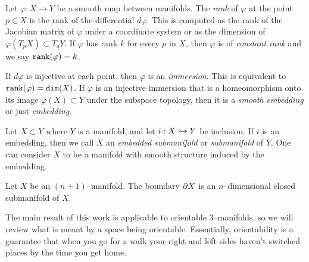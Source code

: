 \begin{defn}[Embedding]
	Let $\varphi:X\to Y$ be a smooth map between manifolds.
	The \emph{rank} of $\varphi$ at the point $p\in X$ is the rank of the differential $d\varphi$.
	This is computed as the rank of the Jacobian matrix of $\varphi$ under a coordinate system or as the dimension of $\varphi(T_p X)\subset T_q Y$.
	If $\varphi$ has rank $k$ for every $p$ in $X$, then $\varphi$ is of \emph{constant rank} and we say $\texttt{rank}(\varphi)=k$.
	
	If $d\varphi$ is injective at each point, then $\varphi$ is an \emph{immersion}.
	This is equivalent to $\texttt{rank}(\varphi)=\texttt{dim}(X)$.
	If $\varphi$ is an injective immersion that is a homeomorphism onto its image $\varphi(X)\subset Y$ under the subspace topology, then it is a \emph{smooth embedding} or just \emph{embedding}.
	
	Let $X\subset Y$ where $Y$ is a manifold, and let $i:X\hookrightarrow Y$ be inclusion.
	If $i$ is an embedding, then we call $X$ an \emph{embedded submanifold} or \emph{submanifold} of $Y$.
	One can consider $X$ to be a manifold with smooth structure induced by the embedding.
\end{defn}

\begin{prop}
	\label{prop:boundariesaremanifolds}
	Let $X$ be an $(n+1)$--manifold.
	The boundary $\partial X$ is an $n$--dimensional closed submanifold of $X$.
\end{prop}

The main result of this work is applicable to orientable 3--manifolds, so we will review what is meant by a space being orientable.
Essentially, orientability is a guarantee that when you go for a walk your right and left sides haven't switched places by the time you get home.

